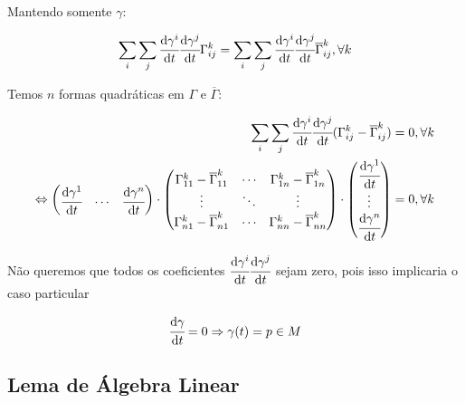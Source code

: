 \documentclass[10pt,a4paper]{article}
\begin{document}
		Mantendo somente $\gamma$:

		\begin{align*}
		  \sum_i \sum_j \cfrac{\mathrm{d} \gamma^i}{\mathrm{d} t} \cfrac{\mathrm{d} \gamma^j}{\mathrm{d} t} \Gamma_{ij}^k = \sum_i \sum_j \cfrac{\mathrm{d} \gamma^i}{\mathrm{d} t} \cfrac{\mathrm{d} \gamma^j}{\mathrm{d} t} \overline{\Gamma}_{ij}^k, \forall k
		\end{align*}

		Temos $n$ formas quadr\'aticas em $\Gamma$ e $\overline{\Gamma}$:

		\begin{align*}
		  \sum_i \sum_j \cfrac{\mathrm{d} \gamma^i}{\mathrm{d} t} \cfrac{\mathrm{d} \gamma^j}{\mathrm{d} t} ( \Gamma_{ij}^k - \overline{\Gamma}_{ij}^k ) &= 0, \forall k \\
		  \Leftrightarrow \left( \begin{matrix} \cfrac{\mathrm{d} \gamma^1}{\mathrm{d} t} & \cdots & \cfrac{\mathrm{d} \gamma^n}{\mathrm{d} t} \end{matrix} \right) \cdot \left( \begin{matrix} \Gamma_{11}^k - \overline{\Gamma}_{11}^k & \cdots & \Gamma_{1n}^k - \overline{\Gamma}_{1n}^k \\ \vdots & \ddots & \vdots \\ \Gamma_{n1}^k - \overline{\Gamma}_{n1}^k & \cdots & \Gamma_{nn}^k - \overline{\Gamma}_{nn}^k \end{matrix} \right) \cdot \left( \begin{matrix} \cfrac{\mathrm{d} \gamma^1}{\mathrm{d} t} \\ \vdots \\ \cfrac{\mathrm{d} \gamma^n}{\mathrm{d} t} \end{matrix} \right) &= 0, \forall k
		\end{align*}

		N\~ao queremos que todos os coeficientes $\cfrac{\mathrm{d} \gamma^i}{\mathrm{d} t} \cfrac{\mathrm{d} \gamma^j}{\mathrm{d} t}$ sejam zero, pois isso implicaria o caso particular

		\begin{align*}
		\cfrac{\mathrm{d} \gamma}{\mathrm{d} t} = 0 \Rightarrow \gamma(t) = p \in M
		\end{align*}

		\subsection{Lema de \'Algebra Linear}
		\begin{flushright}
		\end{flushright}
\end{document}
